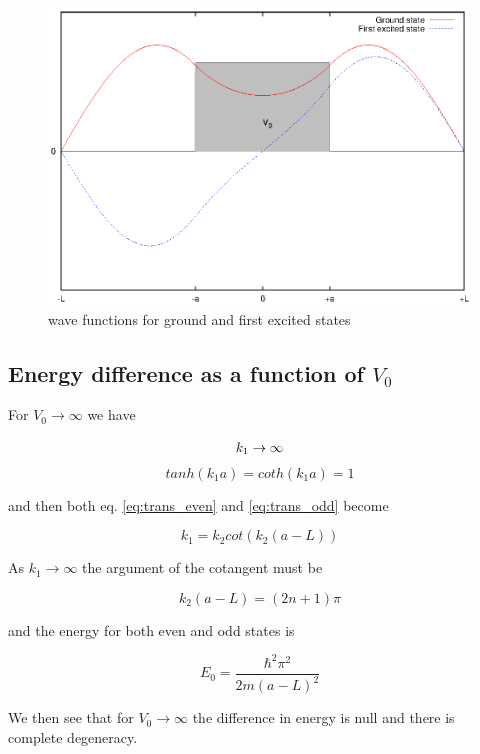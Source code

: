 \documentclass{article}
\begin{document}
\begin{figure}
\centering
\includegraphics{ex_1_3_psi.eps}
\caption{wave functions for ground and first excited states}
\label{ex_1_3_psi}
\end{figure}

\subsection{Energy difference as a function of \(V_0\)}
For \(V_0 \rightarrow \infty\) we have

\[
k_1 \rightarrow \infty \\
\]
\[
tanh(k_1a) = coth(k_1a) = 1
\]

and then both eq. \eqref{eq:trans_even} and \eqref{eq:trans_odd} become

\begin{equation}
k_1 = k_2 cot(k_2(a-L))
\end{equation}

As \(k_1 \rightarrow \infty\) the argument of the cotangent must be

\begin{equation}
\label{eq:k2_v0big}
k_2(a-L) = (2n+1)\pi
\end{equation}

and the energy for both even and odd states is

\begin{equation}
E_0 = \frac{\hbar^2 \pi^2}{2m(a-L)^2}
\end{equation}

We then see that for \( V_0 \rightarrow \infty \) the difference in energy is null and there is complete degeneracy.
\end{document}

